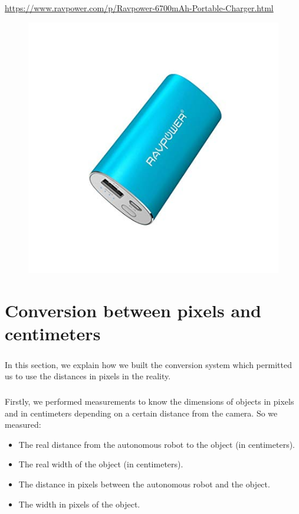 \documentclass[12pt]{report}
\begin{document}
	\paragraph{}
	\url{https://www.ravpower.com/p/Ravpower-6700mAh-Portable-Charger.html}
	\begin{figure}[H]
		\begin{center}
			\includegraphics[scale=0.6]{res/power.jpg}
		\end{center}
	\end{figure}
\chapter{Conversion between pixels and centimeters}
\paragraph{}
In this section, we explain how we built the conversion system which permitted us to use the distances in pixels in the reality.
\paragraph{}
Firstly, we performed measurements to know the dimensions of objects in pixels and in centimeters depending on a certain distance from the camera. So we measured:
\begin{itemize}
	\item The real distance from the autonomous robot to the object (in centimeters).
	\item The real width of the object (in centimeters).
	\item The distance in pixels between the autonomous robot and the object.
	\item The width in pixels of the object.
\end{itemize}
\end{document}
